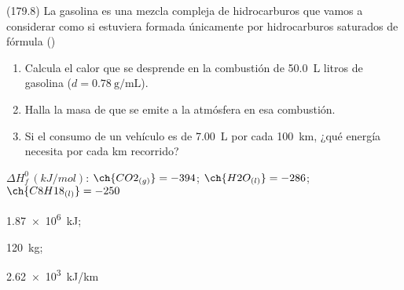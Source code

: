   \begin{exercise}[
      tags    = {},
      topics  = {química, termodinámica, termoquímica},
      source  = {FQ 1B MGH 2016, p179, e8},
    ]
    (179.8) La gasolina es una mezcla compleja de hidrocarburos que
    vamos a considerar como si estuviera formada únicamente
    por hidrocarburos saturados de fórmula ()
    \begin{enumerate}
      \item Calcula el calor que se desprende en la combustión de
      \SI{50.0}{\liter} litros de gasolina (\( d = \SI{0.78}{\gram\per\milli\liter} \)).
      \item Halla la masa de  que se emite a la atmósfera en esa
      combustión.
      \item Si el consumo de un vehículo es de \SI{7.00}{\liter} por cada
      \SI{100}{km}, ¿qué energía necesita por cada \si{km} recorrido?
    \end{enumerate}

    \begin{gexdatos}
      \( \Delta H^0_f\,(\si{kJ/mol}) \): \( \ch{CO2_{(g)}} = -394 \); \( \ch{H2O_{(l)}} = -286 \); \( \ch{C8H18_{(l)}} = -250 \)
    \end{gexdatos}
  \end{exercise}

  \begin{solution}
    \begin{enumerate*}
      \item \SI{1.87e6}{kJ}; \item \SI{120}{\kilo\gram}; \item \SI{2.62e3}{kJ/km}
    \end{enumerate*}
  \end{solution}




